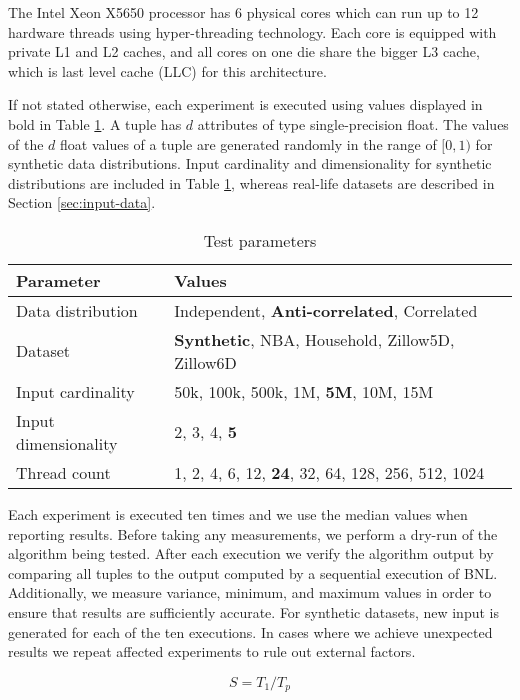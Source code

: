 \documentclass[12pt,a4paper,twoside]{report}
\begin{document}
The Intel Xeon X5650 processor has 6 physical cores which can
run up to 12 hardware threads using hyper-threading
technology. Each core is equipped with private L1 and L2
caches, and all cores on one die share the bigger L3 cache,
which is last level cache (LLC) for this architecture.

If not stated otherwise, each experiment is executed using values
displayed in bold in Table \ref{tab:test-params}. A tuple has $d$
attributes of type single-precision float. The values of the $d$ float
values of a tuple are generated randomly in the range of $[0,1)$ for
synthetic data distributions. Input cardinality and dimensionality for
synthetic distributions are included in Table \ref{tab:test-params},
whereas real-life datasets are described in Section
\ref{sec:input-data}.

\begin{table}[H]
	\centering
	\begin{tabular}{lp{10cm}}
		\hline \textbf{Parameter} & \textbf{Values} \\ \hline
		Data distribution & Independent, \textbf{Anti-correlated}, Correlated\\
		Dataset & \textbf{Synthetic}, NBA, Household, Zillow5D, Zillow6D \\
		Input cardinality & 50k, 100k, 500k, 1M, \textbf{5M}, 10M, 15M\\
		Input dimensionality & 2, 3, 4, \textbf{5}\\
		Thread count & 1, 2, 4, 6, 12, \textbf{24}, 32, 64, 128, 256, 512, 1024 \\ \hline
	\end{tabular}
	\caption{Test parameters}
	\label{tab:test-params}
\end{table}

Each experiment is executed ten times and we use the median values
when reporting results. Before taking any measurements, we perform a
dry-run of the algorithm being tested. After each execution we verify
the algorithm output by comparing all tuples to the output computed by
a sequential execution of BNL. Additionally, we measure variance,
minimum, and maximum values in order to ensure that results are
sufficiently accurate. For synthetic datasets, new input is generated
for each of the ten executions. In cases where we achieve unexpected
results we repeat affected experiments to rule out external
factors.

\begin{equation}
	S = T_1 / T_p
	\label{eq:speedup}
\end{equation} 
\end{document}
